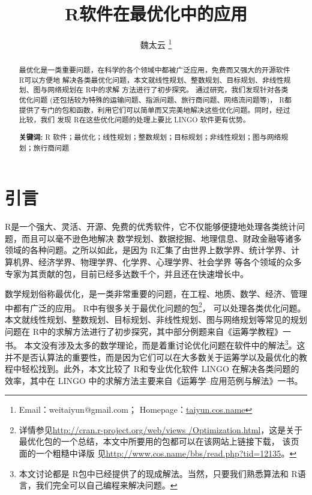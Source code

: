 \documentclass{article}
\newcommand{\R}{\textsf{R}}
\begin{document}
\title{\heiti \R 软件在最优化中的应用}

\author{魏太云 \thanks{
	Email：weitaiyun@gmail.com；
	Homepage：\url{taiyun.cos.name} }}
\date{}
\maketitle

\begin{abstract}
最优化是一类重要问题，在科学的各个领域中都被广泛应用，免费而又强大的开源软件 \R 可以方便地
解决各类最优化问题，本文就线性规划、整数规划、目标规划、非线性规划、图与网络规划在 \R 中的求解
方法进行了初步探究。
通过研究，我们发现针对各类优化问题 (还包括较为特殊的运输问题、指派问题、旅行商问题、网络流问题等)，
\R 都提供了专门的包和函数，利用它们可以简单而又完美地解决这些优化问题。同时，经过比较，我们
发现 \R 在这些优化问题的处理上要比 LINGO 软件更有优势。

\textbf{关键词:} R 软件；最优化；线性规划；整数规划；目标规划；非线性规划；图与网络规划；旅行商问题
\end{abstract}

\section{引言}
\R \citep{R08}是一个强大、灵活、开源、免费的优秀软件，它不仅能够便捷地处理各类统计问题，而且可以毫不逊色地解决
数学规划、数据挖掘、地理信息、财政金融等诸多领域的各种问题。之所以如此，是因为
 \R 汇集了由世界上数学界、统计学界、计算机界、经济学界、物理学界、化学界、心理学界、社会学界
等各个领域的众多专家为其贡献的包，目前已经多达数千个，并且还在快速增长中。

数学规划俗称最优化，是一类非常重要的问题，在工程、地质、数学、经济、管理中都有广泛的应用。
\R 中有很多关于最优化问题的包\footnote{详情参见\url{http://cran.r-project.org/web/views
/Optimization.html}，这是关于最优化包的一个总结，本文中所要用的包都可以在该网站上链接下载，
该页面的一个粗糙中译版%
见\url{http://www.cos.name/bbs/read.php?tid=12135}。}，
可以处理各类优化问题。本文就线性规划、整数规划、目标规划、非线性规划、图与网络规划等常见的规划问题在 \R 中的求解方法进行了初步探究，其中部分例题来自《运筹学教程》\citep{Op07}一书。
本文没有涉及太多的数学理论，而是着重讨论优化问题在软件中的解法\footnote{本文讨论都是 \R 包中已经提供了的现成解法。当然，只要我们熟悉算法和 \R 语言，我们完全可以自己编程来解决问题。}。这并不是否认算法的重要性，而是因为它们可以在大多数关于运筹学以及最优化的教程中轻松找到。此外，本文比较了 \R 和专业优化软件 LINGO 在解决各类问题的效率，其中在 LINGO 中的求解方法主要来自《运筹学--应用范例与解法》\citep{OP06}一书。
\end{document}
